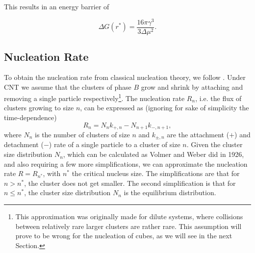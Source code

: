 \documentclass[thesis]{subfiles}
\begin{document}
This results in an energy barrier of 

\begin{equation}
	\Delta G (r^*) = \frac{16 \pi \gamma^3}{3 \Delta\mu^2}.
\end{equation}

\subsection{Nucleation Rate} \label{subsec:nucl rate}

To obtain the nucleation rate from classical nucleation theory, we follow \cite{valeriani2007numerical}. Under CNT we assume that the clusters of phase $B$ grow and shrink by attaching and removing a single particle respectively\footnote{This  approximation was originally made for dilute systems\cite{katz1992homogeneous}, where collisions between relatively rare larger clusters are rather rare. This assumption will prove to be wrong for the nucleation of cubes, as we will see in the next Section.}. %
The nucleation rate $R_n$, i.e. the flux of clusters growing to size $n$, can be expressed as (ignoring for sake of simplicity the time-dependence)
\begin{equation}
	R_n = N_n k_{+, n} - N_{n + 1} k_{-, n + 1},
\end{equation}
where $N_n$ is the number of clusters of size $n$ and $k_{\pm, n}$ are the attachment ($+$) and detachment ($-$) rate of a single particle to a cluster of size $n$. Given the cluster size distribution $N_n$, which can be calculated as Volmer and Weber did in 1926\cite{volmer1926keimbildung}, and also requiring a few more simplifications, we can approximate the nucleation rate $R = R_{n^*}$, with $n^*$ the critical nucleus size. The simplifications are that for $n > n^*$, the cluster does not get smaller. The second simplification is that for $n \leq n^*$, the cluster size distribution $N_n$ is the equilibrium distribution.
\end{document}
